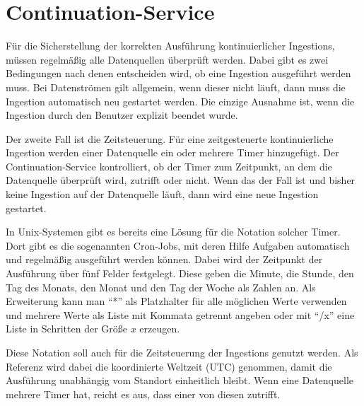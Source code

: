 \section{Continuation-Service}

Für die Sicherstellung der korrekten Ausführung kontinuierlicher Ingestions, müssen regelmäßig alle Datenquellen überprüft werden.
Dabei gibt es zwei Bedingungen nach denen entscheiden wird, ob eine Ingestion ausgeführt werden muss.
Bei Datenströmen gilt allgemein, wenn dieser nicht läuft, dann muss die Ingestion automatisch neu gestartet werden.
Die einzige Ausnahme ist, wenn die Ingestion durch den Benutzer explizit beendet wurde.

Der zweite Fall ist die Zeitsteuerung.
Für eine zeitgesteuerte kontinuierliche Ingestion werden einer Datenquelle ein oder mehrere Timer hinzugefügt.
Der Continuation-Service kontrolliert, ob der Timer zum Zeitpunkt, an dem die Datenquelle überprüft wird, zutrifft oder nicht.
Wenn das der Fall ist und bisher keine Ingestion auf der Datenquelle läuft, dann wird eine neue Ingestion gestartet.

In Unix-Systemen gibt es bereits eine Lösung für die Notation solcher Timer.
Dort gibt es die sogenannten Cron-Jobs, mit deren Hilfe Aufgaben automatisch und regelmäßig ausgeführt werden können.
Dabei wird der Zeitpunkt der Ausführung über fünf Felder festgelegt.
Diese geben die Minute, die Stunde, den Tag des Monats, den Monat und den Tag der Woche als Zahlen an.
Als Erweiterung kann man "`*"' als Platzhalter für alle möglichen Werte verwenden und mehrere Werte als Liste mit Kommata getrennt angeben oder mit "`/x"' eine Liste in Schritten der Größe $x$ erzeugen.

Diese Notation soll auch für die Zeitsteuerung der Ingestions genutzt werden.
Als Referenz wird dabei die koordinierte Weltzeit (UTC) genommen, damit die Ausführung unabhängig vom Standort einheitlich bleibt.
Wenn eine Datenquelle mehrere Timer hat, reicht es aus, dass einer von diesen zutrifft.